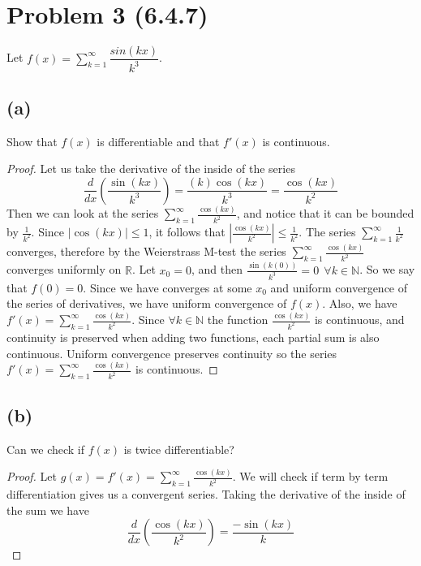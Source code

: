 \documentclass{article}
\begin{document}
\section*{Problem 3 (6.4.7)}
Let $f(x) = \sum_{k=1}^\infty \dfrac{sin(kx)}{k^3}$.
\subsection*{(a)}
Show that $f(x)$ is differentiable and that $f'(x)$ is continuous.
\begin{proof}
    Let us take the derivative of the inside of the series
    \[
        \frac{d}{dx}\left(\frac{\sin(kx)}{k^3}\right) = \frac{(k)\cos(kx)}{k^3} = \frac{\cos(kx)}{k^2}
    \]
    Then we can look at the series $\sum_{k=1}^\infty \frac{\cos(kx)}{k^2}$, and notice that it can be bounded by $\frac{1}{k^2}$.
    Since $|\cos(kx)| \leqslant 1$, it follows that $\left|\frac{\cos(kx)}{k^2}\right| \leqslant \frac{1}{k^2}$.
    The series $\sum_{k=1}^\infty \frac{1}{k^2}$ converges, therefore by the Weierstrass M-test the series $\sum_{k=1}^\infty \frac{\cos(kx)}{k^2}$ converges uniformly on $\mathbb{R}$.
    Let $x_0 = 0$, and then $\frac{\sin(k(0))}{k^3} = 0 \ \ \forall k \in \mathbb{N}$.
    So we say that $f(0) = 0$.
    Since we have converges at some $x_0$ and uniform convergence of the series of derivatives, we have uniform convergence of $f(x)$.
    Also, we have $f'(x) = \sum_{k=1}^\infty \frac{\cos(kx)}{k^2}$.
    Since $\forall k \in \mathbb{N}$ the function $\frac{\cos(kx)}{k^2}$ is continuous, and continuity is preserved when adding two functions, each partial sum is also continuous.
    Uniform convergence preserves continuity so the series $f'(x) = \sum_{k=1}^\infty \frac{\cos(kx)}{k^2}$ is continuous.
\end{proof}
\subsection*{(b)}
Can we check if $f(x)$ is twice differentiable?
\begin{proof}
    Let $g(x) = f'(x) = \sum_{k=1}^\infty \frac{\cos(kx)}{k^2}$.
    We will check if term by term differentiation gives us a convergent series.
    Taking the derivative of the inside of the sum we have
    \[
        \frac{d}{dx}\left(\frac{\cos(kx)}{k^2}\right) = \frac{-\sin(kx)}{k}
    \]
\end{proof}
\end{document}
